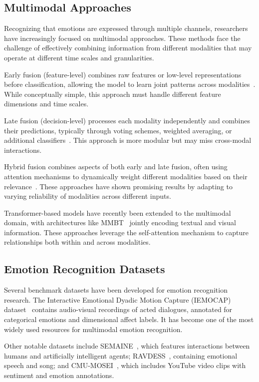 \documentclass[12pt]{article}
\begin{document}
\subsection{Multimodal Approaches}
Recognizing that emotions are expressed through multiple channels, researchers have increasingly focused on multimodal approaches. These methods face the challenge of effectively combining information from different modalities that may operate at different time scales and granularities.

Early fusion (feature-level) combines raw features or low-level representations before classification, allowing the model to learn joint patterns across modalities~\cite{poria2017review}. While conceptually simple, this approach must handle different feature dimensions and time scales.

Late fusion (decision-level) processes each modality independently and combines their predictions, typically through voting schemes, weighted averaging, or additional classifiers~\cite{wagner2011introducting}. This approach is more modular but may miss cross-modal interactions.

Hybrid fusion combines aspects of both early and late fusion, often using attention mechanisms to dynamically weight different modalities based on their relevance~\cite{zadeh2018memory}. These approaches have shown promising results by adapting to varying reliability of modalities across different inputs.

Transformer-based models have recently been extended to the multimodal domain, with architectures like MMBT~\cite{kiela2019supervised} jointly encoding textual and visual information. These approaches leverage the self-attention mechanism to capture relationships both within and across modalities.

\subsection{Emotion Recognition Datasets}
Several benchmark datasets have been developed for emotion recognition research. The Interactive Emotional Dyadic Motion Capture (IEMOCAP) dataset~\cite{busso2008iemocap} contains audio-visual recordings of acted dialogues, annotated for categorical emotions and dimensional affect labels. It has become one of the most widely used resources for multimodal emotion recognition.

Other notable datasets include SEMAINE~\cite{mckeown2012semaine}, which features interactions between humans and artificially intelligent agents; RAVDESS~\cite{livingstone2018ryerson}, containing emotional speech and song; and CMU-MOSEI~\cite{zadeh2018multimodal}, which includes YouTube video clips with sentiment and emotion annotations.
\end{document}
